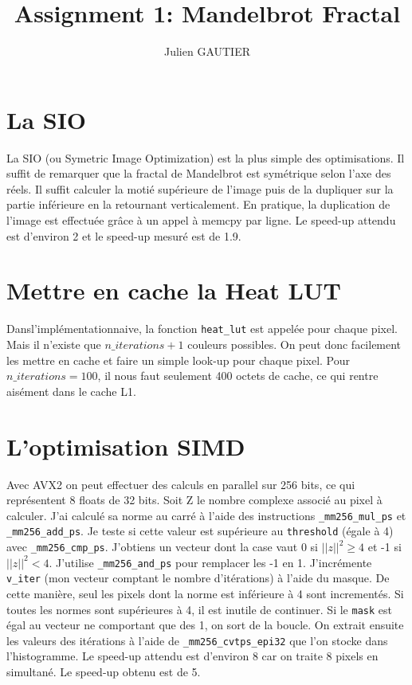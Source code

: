\documentclass{article}
\title{Assignment 1: Mandelbrot Fractal}
\author{Julien GAUTIER}
\begin{document}
\maketitle

\section{La SIO}
La SIO (ou Symetric Image Optimization) est la plus simple des optimisations. Il suffit de remarquer que la fractal
de Mandelbrot est symétrique selon l’axe des réels. Il suffit calculer la motié supérieure de l’image puis de la
dupliquer sur la partie inférieure en la retournant verticalement. En pratique, la duplication de l’image est effectuée
grâce à un appel à memcpy par ligne. Le speed-up attendu est d’environ 2 et le speed-up mesuré est de 1.9.

\section{Mettre en cache la Heat LUT}
Dansl’implémentationnaive, la fonction \texttt{heat\_lut} est appelée pour chaque pixel. Mais il n’existe que $n\_iterations+1$
couleurs possibles. On peut donc facilement les mettre en cache et faire un simple look-up pour chaque pixel. Pour
$n\_iterations = 100$, il nous faut seulement 400 octets de cache, ce qui rentre aisément dans le cache L1.

\section{L’optimisation SIMD}
Avec AVX2 on peut effectuer des calculs en parallel sur 256 bits, ce qui représentent 8 floats de 32 bits. Soit Z le
nombre complexe associé au pixel à calculer. J’ai calculé sa norme au carré à l’aide des instructions \texttt{\_mm256\_mul\_ps}
et \texttt{\_mm256\_add\_ps}. Je teste si cette valeur est supérieure au \texttt{threshold} (égale à 4) avec \texttt{\_mm256\_cmp\_ps}. J’obtiens
un vecteur dont la case vaut 0 si $||z||^2 \geq 4$ et -1 si $||z||^2 < 4$. J’utilise \texttt{\_mm256\_and\_ps} pour remplacer les -1 en
1. J’incrémente \texttt{v\_iter} (mon vecteur comptant le nombre d’itérations) à l’aide du masque. De cette manière, seul
les pixels dont la norme est inférieure à 4 sont incrementés. Si toutes les normes sont supérieures à 4, il est inutile
de continuer. Si le \texttt{mask} est égal au vecteur ne comportant que des 1, on sort de la boucle. On extrait ensuite les
valeurs des itérations à l’aide de \texttt{\_mm256\_cvtps\_epi32} que l’on stocke dans l’histogramme. Le speed-up attendu est
d’environ 8 car on traite 8 pixels en simultané. Le speed-up obtenu est de 5.
\end{document}
